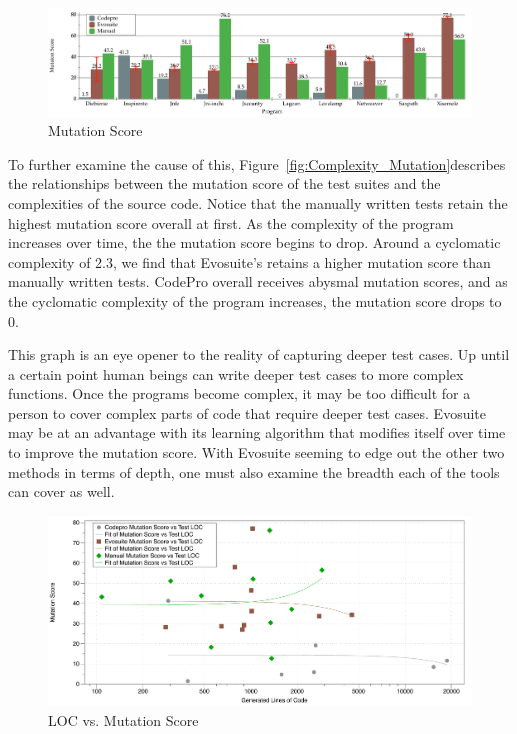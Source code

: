 \begin{figure}[!t]
\centering
  \includegraphics[width=\textwidth]{Mutation_Score}
    \caption{Mutation Score}
  \label{fig:Mutation_Score}
\end{figure}

To further examine the cause of this, Figure~\ref{fig:Complexity_Mutation}describes the relationships between the mutation score of the test suites and the complexities of the source code. Notice that the manually written tests retain the highest mutation score overall at first. As the complexity of the program increases over time, the the mutation score begins to drop. Around a cyclomatic complexity of 2.3, we find that Evosuite's retains a higher mutation score than manually written tests. CodePro overall receives abysmal mutation scores, and as the cyclomatic complexity of the program increases, the mutation score drops to 0.

This graph is an eye opener to the reality of capturing deeper test cases. Up until a certain point human beings can write deeper test cases to more complex functions. Once the programs become complex, it may be too difficult for a person to cover complex parts of code that require deeper test cases. Evosuite may be at an advantage with its learning algorithm that modifies itself over time to improve the mutation score. With Evosuite seeming to edge out the other two methods in terms of depth, one must also examine the breadth each of the tools can cover as well.

\begin{figure}[!t]
\centering
  \includegraphics[width=\textwidth]{LOC_Mutation}
    \caption{LOC vs. Mutation Score}
  \label{fig:LOC_Mutation}
\end{figure}



